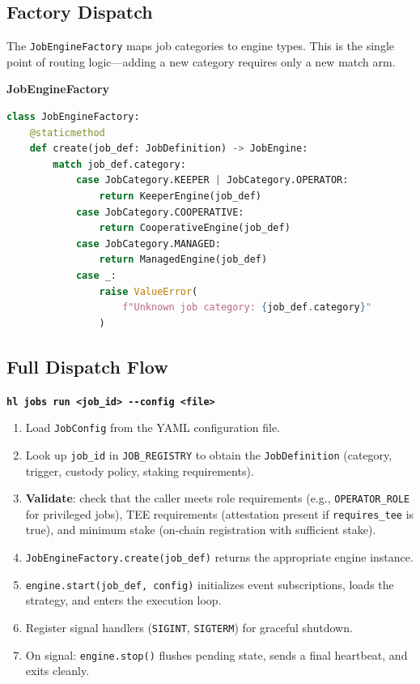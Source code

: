 \documentclass[11pt,a4paper]{article}
\begin{document}
\subsection{Factory Dispatch}

The \texttt{JobEngineFactory} maps job categories to engine types. This is the
single point of routing logic---adding a new category requires only a new match arm.

\begin{contractbox}
\textbf{JobEngineFactory}
\begin{lstlisting}[language=Python]
class JobEngineFactory:
    @staticmethod
    def create(job_def: JobDefinition) -> JobEngine:
        match job_def.category:
            case JobCategory.KEEPER | JobCategory.OPERATOR:
                return KeeperEngine(job_def)
            case JobCategory.COOPERATIVE:
                return CooperativeEngine(job_def)
            case JobCategory.MANAGED:
                return ManagedEngine(job_def)
            case _:
                raise ValueError(
                    f"Unknown job category: {job_def.category}"
                )
\end{lstlisting}
\end{contractbox}

\subsection{Full Dispatch Flow}

\begin{flowbox}
\textbf{\texttt{hl jobs run <job\_id> -{}-config <file>}}
\begin{enumerate}[leftmargin=2em]
  \item Load \texttt{JobConfig} from the YAML configuration file.
  \item Look up \texttt{job\_id} in \texttt{JOB\_REGISTRY} to obtain the
        \texttt{JobDefinition} (category, trigger, custody policy, staking
        requirements).
  \item \textbf{Validate}: check that the caller meets role requirements (e.g.,
        \texttt{OPERATOR\_ROLE} for privileged jobs), TEE requirements (attestation
        present if \texttt{requires\_tee} is true), and minimum stake (on-chain
        registration with sufficient stake).
  \item \texttt{JobEngineFactory.create(job\_def)} returns the appropriate engine
        instance.
  \item \texttt{engine.start(job\_def, config)} initializes event subscriptions,
        loads the strategy, and enters the execution loop.
  \item Register signal handlers (\texttt{SIGINT}, \texttt{SIGTERM}) for graceful
        shutdown.
  \item On signal: \texttt{engine.stop()} flushes pending state, sends a final
        heartbeat, and exits cleanly.
\end{enumerate}
\end{flowbox}
\end{document}

